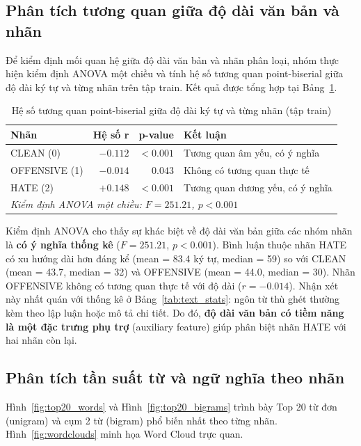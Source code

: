 \subsection{Phân tích tương quan giữa độ dài văn bản và nhãn}
Để kiểm định mối quan hệ giữa độ dài văn bản và nhãn phân loại, nhóm thực hiện kiểm định ANOVA một chiều và tính hệ số tương quan point-biserial giữa độ dài ký tự và từng nhãn trên tập train. Kết quả được tổng hợp tại Bảng~\ref{tab:correlation}.

\begin{table}[H]
    \centering
    \caption{Hệ số tương quan point-biserial giữa độ dài ký tự và từng nhãn (tập train)}
    \label{tab:correlation}
    \begin{tabular}{lrrp{6.5cm}}
        \hline
        \textbf{Nhãn} & \textbf{Hệ số r} & \textbf{p-value} & \textbf{Kết luận}                \\
        \hline
        CLEAN (0)     & $-0.112$         & $< 0.001$        & Tương quan âm yếu, có ý nghĩa    \\
        OFFENSIVE (1) & $-0.014$         & $0.043$          & Không có tương quan thực tế      \\
        HATE (2)      & $+0.148$         & $< 0.001$        & Tương quan dương yếu, có ý nghĩa \\
        \hline
        \multicolumn{4}{l}{\textit{Kiểm định ANOVA một chiều: $F = 251.21$, $p < 0.001$}}      \\
        \hline
    \end{tabular}
\end{table}

Kiểm định ANOVA cho thấy sự khác biệt về độ dài văn bản giữa các nhóm nhãn là \textbf{có ý nghĩa thống kê} ($F = 251.21$, $p < 0.001$). Bình luận thuộc nhãn HATE có xu hướng dài hơn đáng kể (mean = 83.4 ký tự, median = 59) so với CLEAN (mean = 43.7, median = 32) và OFFENSIVE (mean = 44.0, median = 30). Nhãn OFFENSIVE không có tương quan thực tế với độ dài ($r = -0.014$). Nhận xét này nhất quán với thống kê ở Bảng~\ref{tab:text_stats}: ngôn từ thù ghét thường kèm theo lập luận hoặc mô tả chi tiết. Do đó, \textbf{độ dài văn bản có tiềm năng là một đặc trưng phụ trợ} (auxiliary feature) giúp phân biệt nhãn HATE với hai nhãn còn lại.

\subsection{Phân tích tần suất từ và ngữ nghĩa theo nhãn}
Hình~\ref{fig:top20_words} và Hình~\ref{fig:top20_bigrams} trình bày Top 20 từ đơn (unigram) và cụm 2 từ (bigram) phổ biến nhất theo từng nhãn. Hình~\ref{fig:wordclouds} minh họa Word Cloud trực quan.

